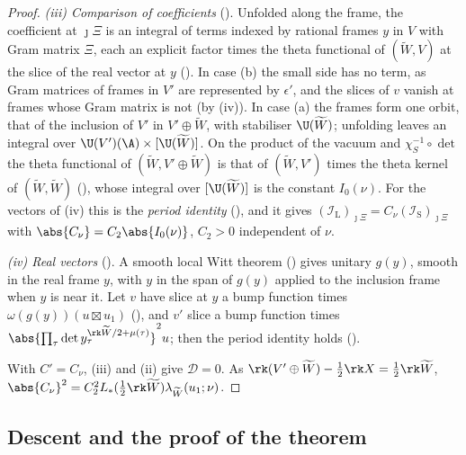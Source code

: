\begin{proof}
\emph{(iii) Comparison of coefficients}
(). Unfolded along the frame, the
coefficient at $\jmath\Xi$ is an integral of terms indexed by rational frames $y$ in $V$ with Gram
matrix $\Xi$, each an explicit factor times the theta functional of $(\widetilde W,V)$ at the slice of the
real vector at $y$ (). In case (b) the small
side has no term, as Gram matrices of frames in $V'$ are represented by $\epsilon'$, and the slices
of $v$ vanish at frames whose Gram matrix is not (by (iv)). In case (a) the frames form one orbit,
that of the inclusion of $V'$ in $V'\oplus \widetilde W$, with stabiliser $\U(\widetilde W)$; unfolding leaves an
integral over $\U(V')(\A)\times[\U(\widetilde W)]$. On the product of the vacuum and $\chi_S^{-1}\circ\det$
the theta functional of $(\widetilde W,V'\oplus \widetilde W)$ is that of $(\widetilde W,V')$ times the theta kernel of
$(\widetilde W,\widetilde W)$ (), whose integral over $[\U(\widetilde W)]$ is
the constant $I_0(\nu)$. For the vectors of (iv) this is the \emph{period identity}
(), and it gives $(\mathcal I_{\mathrm L})_{\jmath\Xi}=C_\nu
(\mathcal I_{\mathrm S})_{\jmath\Xi}$ with $\abs{C_\nu}=C_2\abs{I_0(\nu)}$, $C_2>0$ independent of
$\nu$.

\emph{(iv) Real vectors} (). A smooth local Witt
theorem () gives unitary $g(y)$, smooth in the real frame
$y$, with $y$ in the span of $g(y)$ applied to the inclusion frame when $y$ is near it. Let $v$ have
slice at $y$ a bump function times $\omega(g(y))(u\boxtimes u_1)$
(), and $v'$ slice a bump function times
$\abs{\prod_\tau\det y_\tau^{\rk \widetilde W/2+\mu(\tau)}}^2u$; then the period identity holds
().

With $C'=C_\nu$, (iii) and (ii) give $\mathcal D=0$. As $\rk(V'\oplus \widetilde W)-\frac12\rk X=\frac12\rk
\widetilde W$, $\abs{C_\nu}^2=C_2^2L_*(\frac12\rk \widetilde W)\lambda_{\widetilde W}(u_1;\nu)$.
\end{proof}

\subsection{Descent and the proof of the theorem}

